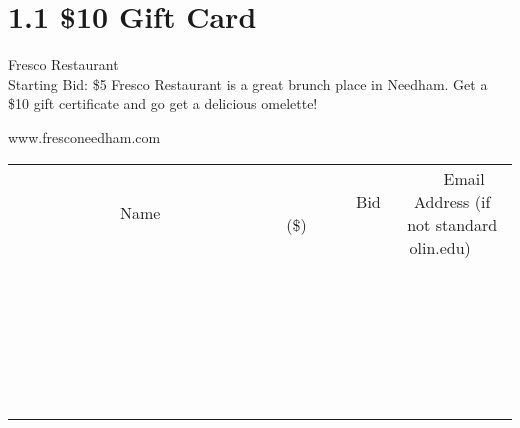 \documentclass[11pt]{article}
\begin{document}
\section*{1.1 \$10 Gift Card}
Fresco Restaurant
\\
Starting Bid: \$5
\newline
Fresco Restaurant is a great brunch place in Needham. Get a \$10 gift certificate and go get a delicious omelette!

www.fresconeedham.com
\\[6ex]
\begin{tabular}{c c c}
~~~~~~~~~~~~~Name~~~~~~~~~~~~~ & ~~~~~~~~~Bid (\$)~~~~~~~~~  & ~~~Email Address (if not standard olin.edu)~~~\\
 & & \\
\hline
 & & \\
\hline
 & & \\
\hline
 & & \\
\hline
 & & \\
\hline
 & & \\
\hline
 & & \\
\hline
 & & \\
\hline
 & & \\
\hline
 & & \\
\hline
 & & \\
\hline
 & & \\
\hline
 & & \\
\hline
 & & \\
\hline
 & & \\
\hline
 & & \\
\hline
 & & \\
\hline
 & & \\
\hline
 & & \\
\hline
 & & \\
\hline
 & & \\
\hline
 & & \\
\hline
 & & \\
\hline
 & & \\
\hline
 & & \\
\hline
 & & \\
\hline
\end{tabular}
\newpage
\end{document}
